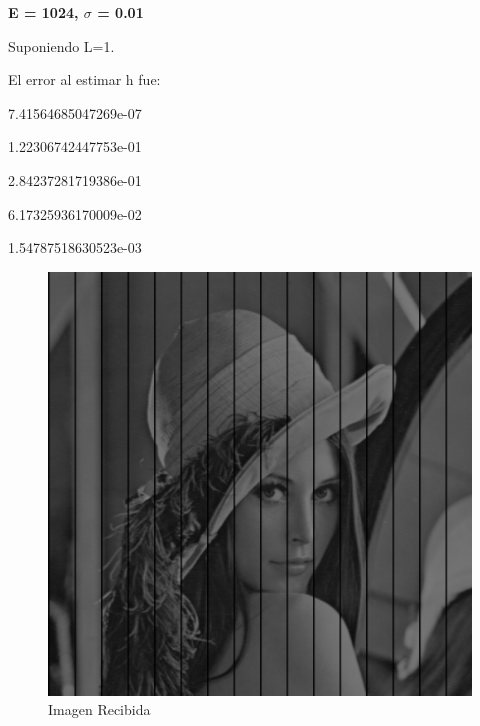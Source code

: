 \documentclass{article}
\begin{document}
\begin{multicols}{2}
\begin{figure}[H]
\end{figure}



\textbf{\large E = 1024,  $\sigma$ = 0.01 }\\

\par \large{Suponiendo L=1.}
\par El error al estimar h fue:\\ 
\par   7.41564685047269e-07
\par  1.22306742447753e-01
\par   2.84237281719386e-01
\par   6.17325936170009e-02
\par   1.54787518630523e-03\\


\begin{figure}[H]
\centering
\includegraphics[scale=0.2]{../img/received_part5a.png}
\caption{Imagen Recibida}

\end{figure}


\end{multicols}
\end{document}
